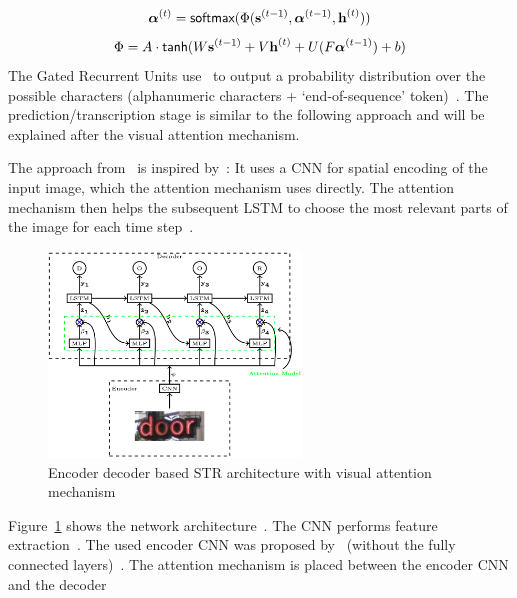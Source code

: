 \begin{equation}\label{eq:sequential-attention-weights}
    \boldsymbol{\alpha}^{(t)}=\textsf{softmax}(\Phi(\textbf{s}^{(t-1)},\boldsymbol{\alpha}^{(t-1)},
        \textbf{h}^{(t)}))
\end{equation}
\begin{equation}\label{eq:sequential-attention-scoring}
    \Phi=A\cdot\textsf{tanh}(W\textbf{s}^{(t-1)}+V\textbf{h}^{(t)}+U(F\boldsymbol{\alpha}^{(t-1)})+b)
\end{equation}
The Gated Recurrent Units use \sfmx\ to output a probability distribution over the possible
characters (alphanumeric characters + `end-of-sequence' token)~\citep{shi_robust_2016}.
The prediction/transcription stage is similar to the following approach and will be explained after
the visual attention mechanism.

The approach from~\cite{ghosh_visual_2017} is inspired by~\cite{bahdanau_neural_2016,xu_show_2016}:
It uses a \ac{CNN} for spatial encoding of the input image, which the attention mechanism uses
directly.
The attention mechanism then helps the subsequent \ac{LSTM} to choose the most relevant parts of the
image for each time step~\citep{ghosh_visual_2017}.
\begin{figure}[h]
    \centering
    \includegraphics[width=0.60\textwidth]{img/STR-encdec-attention-Gosh-Visual-2017.png}
    \caption[Encoder decoder \& visual attention based STR architecture]{%
        Encoder decoder based STR architecture with visual attention
        mechanism~\citep{ghosh_visual_2017}\label{fig:STR-attention}
    }
\end{figure}
Figure~\ref{fig:STR-attention} shows the network architecture~\citep{ghosh_visual_2017}.
The \ac{CNN} performs feature extraction~\citep{ghosh_visual_2017}.
The used encoder \ac{CNN} was proposed by~\cite{jaderberg_reading_2014} (without the fully connected
layers)~\citep{ghosh_visual_2017}.
The attention mechanism is placed between the encoder \ac{CNN} and the decoder
